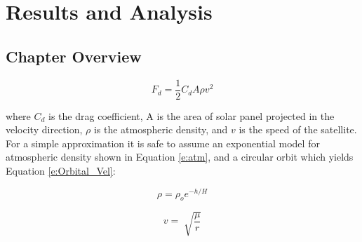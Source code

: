 \chapter{Results and Analysis}
\label{chap:4}




\section{Chapter Overview}



\begin{equation}
\label{e:Drag_Force}
F_{d}=\frac{1}{2}C_{d}A\rho v^2
\end{equation}

where $C_{d}$ is the drag coefficient, A is the area of solar panel projected in the velocity direction, $\rho$ is the atmospheric density, and $v$ is the speed of the satellite. For a simple approximation it is safe to assume an exponential model for atmospheric density shown in Equation \ref{e:atm}, and a circular orbit which yields Equation \ref{e:Orbital_Vel}:

\begin{equation}
\label{e:atm}
\rho=\rho_o e^{-h/H}
\end{equation}

\begin{equation}
\label{e:Orbital_Vel}
v=\sqrt[]{\frac{\mu}{r}}
\end{equation}

